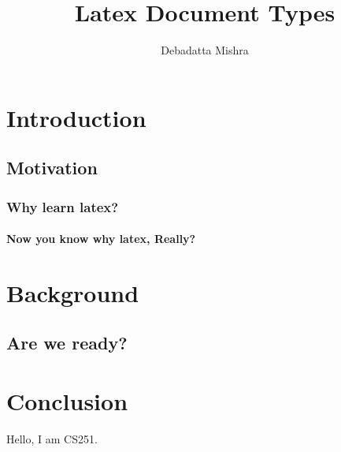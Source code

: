 \documentclass[a4paper, 10pt]{report}
\title{Latex Document Types}
\author{Debadatta Mishra}
\date{}
\begin{document}
\maketitle
\begin{abstract}
\lipsum[30]
\end{abstract}    
\chapter{Introduction}
\lipsum[50]


\lipsum[50]


\lipsum[50]

\section{Motivation}

\lipsum[50]
\subsection{Why learn latex?}
\lipsum[50]

\lipsum[50]

\subsubsection{Now you know why latex, Really?}
\lipsum[50]

\lipsum[50]

\chapter{Background}
\lipsum[50]

\section{Are we ready?}
\lipsum[50]

\lipsum[50]
\chapter{Conclusion}
\lipsum[30]

Hello, I am CS251.
\end{document}
